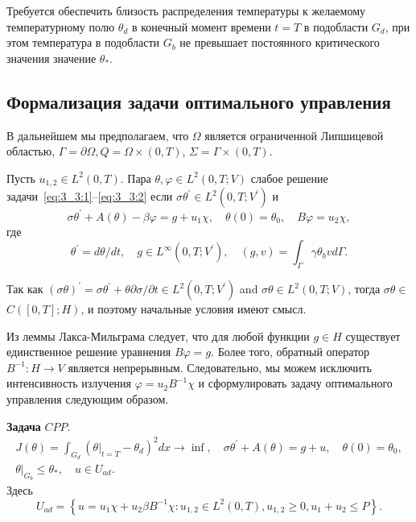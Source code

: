 Требуется обеспечить близость распределения температуры к желаемому температурному полю $\theta_{d}$
в конечный момент времени $t=T$ в подобласти $G_{d}$, при этом температура в подобласти $G_{b}$
не превышает постоянного критического значения значение $\theta_{*}$.

\subsection{Формализация задачи оптимального управления}\label{subsec:ch3:sec3:subsec2}

В дальнейшем мы предполагаем, что $\Omega $ является ограниченной Липшицевой областью,
$\Gamma =\partial \Omega, Q =\Omega \times(0, T)$, $\Sigma=\Gamma \times(0, T)$.

\begin{definition}
    Пусть $u_{1,2} \in L^{2}(0, T)$.
    Пара $\theta, \varphi \in L^{2}(0, T ; V)$ слабое решение задачи~\eqref{eq:3_3:1}--\eqref{eq:3_3:2} если
    $\sigma \theta^{\prime} \in L^{2}\left(0, T ; V^{\prime}\right)$ и
    \begin{equation}
        \label{eq:3_3:3}
        \sigma \theta^{\prime}+A(\theta)-\beta \varphi=g+u_{1} \chi,
        \quad \theta(0)=\theta_{0}, \quad B \varphi=u_{2} \chi,
    \end{equation}
    где
    \[
        \theta^{\prime}=d \theta / d t, \quad g \in L^{\infty}\left(0, T ; V^{\prime}\right),
        \quad(g, v)=\int_{\Gamma} \gamma \theta_{b} v d \Gamma.
    \]
\end{definition}

\begin{remark}
    Так как $(\sigma \theta)^{\prime}=\sigma \theta^{\prime}+\theta
    \partial \sigma / \partial t \in L^{2}\left(0, T ; V^{\prime}\right)$ and $\sigma
    \theta \in L^{2}(0, T ; V)$, тогда $\sigma \theta \in$ $C([0, T] ; H)$,
    и поэтому начальные условия имеют смысл.
\end{remark}

Из леммы Лакса-Мильграма следует, что для любой функции $g \in H$ существует единственное
решение уравнения $B\varphi= g$.
Более того, обратный оператор $B^{-1}: H \rightarrow V$ является непрерывным.
Следовательно, мы можем исключить интенсивность излучения $\varphi=u_{2} B^{-1} \chi$
и сформулировать задачу оптимального управления следующим образом.


\textbf{Задача} $CPP$.
\[
    \begin{gathered}
        J(\theta)=\int_{G_{d}}\left(\left.\theta\right|_{t=T}
        - \theta_{d}\right)^{2} d x \rightarrow \inf,
        \quad \sigma \theta^{\prime}+A(\theta)=g+u, \quad \theta(0)=\theta_{0}, \\
        \left.\theta\right|_{G_{b}} \leq \theta_{*}, \quad u \in U_{a d}.
    \end{gathered}
\]
Здесь
\[
    U_{a d}=\left\{u=u_{1} \chi+u_{2} \beta B^{-1} \chi: u_{1,2} \in L^{2}(0, T), u_{1,2}
    \geq 0, u_{1}+u_{2} \leq P\right\}.
\]

